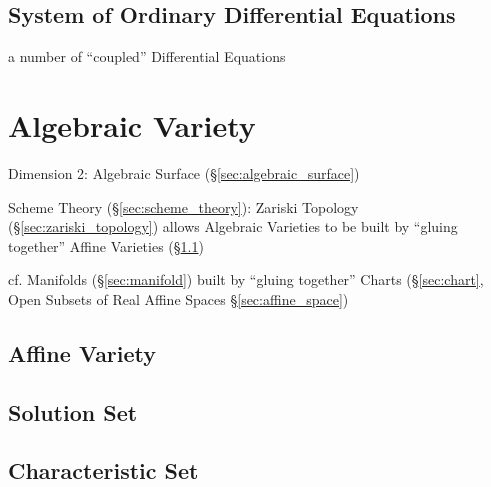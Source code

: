 \subsection{System of Ordinary Differential Equations}
\label{sec:system_of_odes}

a number of ``coupled'' Differential Equations



\section{Algebraic Variety}\label{sec:algebraic_variety}

Dimension 2: Algebraic Surface (\S\ref{sec:algebraic_surface})

Scheme Theory (\S\ref{sec:scheme_theory}): Zariski Topology
(\S\ref{sec:zariski_topology}) allows Algebraic Varieties to be built by
``gluing together'' Affine Varieties (\S\ref{sec:affine_variety})

cf. Manifolds (\S\ref{sec:manifold}) built by ``gluing together'' Charts
(\S\ref{sec:chart}, Open Subsets of Real Affine Spaces
\S\ref{sec:affine_space})




\subsection{Affine Variety}\label{sec:affine_variety}

\subsection{Solution Set}\label{sec:solution_set}

\subsection{Characteristic Set}\label{sec:characteristic_set}

